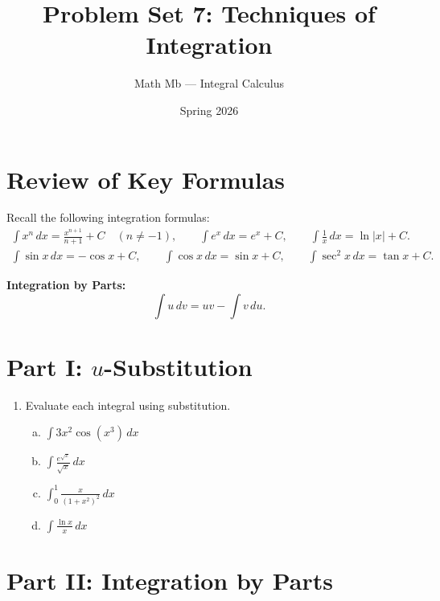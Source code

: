 \documentclass[11pt]{article}
\title{Problem Set 7: Techniques of Integration}
\author{Math Mb --- Integral Calculus}
\date{Spring 2026}
\begin{document}
\maketitle

\section*{Review of Key Formulas}

Recall the following integration formulas:
\begin{gather}
  \int x^n \, dx = \frac{x^{n+1}}{n+1} + C \quad (n \neq -1), \qquad
  \int e^x \, dx = e^x + C, \qquad
  \int \frac{1}{x} \, dx = \ln|x| + C. \\[6pt]
  \int \sin x \, dx = -\cos x + C, \qquad
  \int \cos x \, dx = \sin x + C, \qquad
  \int \sec^2 x \, dx = \tan x + C.
\end{gather}

\textbf{Integration by Parts:}
\[
  \int u \, dv = uv - \int v \, du.
\]

\section*{Part I: $u$-Substitution}

\begin{enumerate}
\item Evaluate each integral using substitution.
\begin{enumerate}[(a)]
  \item $\displaystyle \int 3x^2 \cos(x^3) \, dx$

  \item $\displaystyle \int \frac{e^{\sqrt{x}}}{\sqrt{x}} \, dx$

  \item $\displaystyle \int_0^1 \frac{x}{(1 + x^2)^2} \, dx$

  \item $\displaystyle \int \frac{\ln x}{x} \, dx$
\end{enumerate}
\end{enumerate}

\section*{Part II: Integration by Parts}
\end{document}
